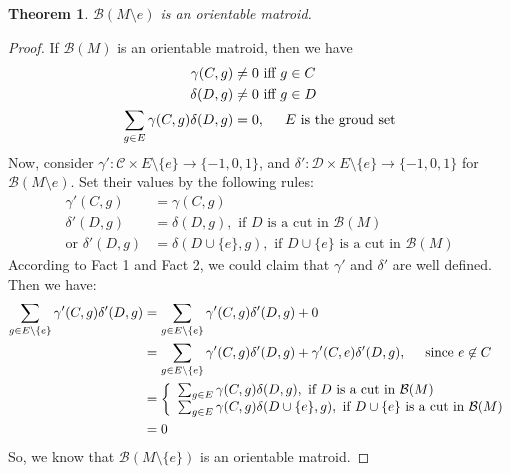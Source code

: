 \documentclass{article}
\newtheorem{theorem}{Theorem}
\begin{document}
\begin{theorem}
  $\mathcal{B}(M\setminus e)$ is an orientable matroid.
\end{theorem}

\begin{proof}
If $\mathcal{B}(M)$ is an orientable matroid,
then we have
\begin{align*}
  \gamma(C, g) &\not= 0 \mbox{ iff } g \in C \\
  \delta(D, g) &\not= 0 \mbox{ iff } g \in D \\
  \sum_{g\in E} \gamma(C, g)\delta(D, g) &= 0, \hspace{0.5cm} \mbox{$E$ is the groud set}
\end{align*}
Now, consider $\gamma': \mathcal{C}\times E\setminus\{e\}\to \{-1, 0, 1\}$, and $\delta': \mathcal{D}\times E\setminus\{e\}\to \{-1, 0, 1\}$ for $\mathcal{B}(M\setminus e)$.
Set their values by the following rules:
\begin{align*}
  \gamma'(C, g) &= \gamma(C, g) \\
  \delta'(D, g) &= \delta(D, g), \mbox{ if $D$ is a cut in $\mathcal{B}(M)$} \\
  \mbox{or } \delta'(D, g) &= \delta(D\cup\{e\}, g), \mbox{ if $D\cup\{e\}$ is a cut in $\mathcal{B}(M)$}
\end{align*}
According to Fact 1 and Fact 2, we could claim that $\gamma'$ and $\delta'$ are well defined.
Then we have:
\begin{align*}
  \sum_{g\in E\setminus\{e\}} \gamma'(C, g)\delta'(D, g) &= \sum_{g\in E\setminus\{e\}} \gamma'(C, g)\delta'(D, g) + 0 \\
                                                         &= \sum_{g\in E\setminus\{e\}} \gamma'(C, g)\delta'(D, g) + \gamma'(C, e)\delta'(D, g), \hspace{0.5cm} \mbox{since $e\not\in C$} \\
                                                         &= \left\{
                                                           \begin{array}{l}
                                                             \sum_{g\in E} \gamma(C, g)\delta(D, g), \mbox{ if $D$ is a cut in $\mathcal{B}(M)$} \\
                                                             \sum_{g\in E} \gamma(C, g)\delta(D\cup\{e\}, g), \mbox{ if $D\cup\{e\}$ is a cut in $\mathcal{B}(M)$}
                                                           \end{array}
  \right. \\
  &= 0
\end{align*}
So, we know that $\mathcal{B}(M\setminus\{e\})$ is an orientable matroid.
\end{proof}
\end{document}
